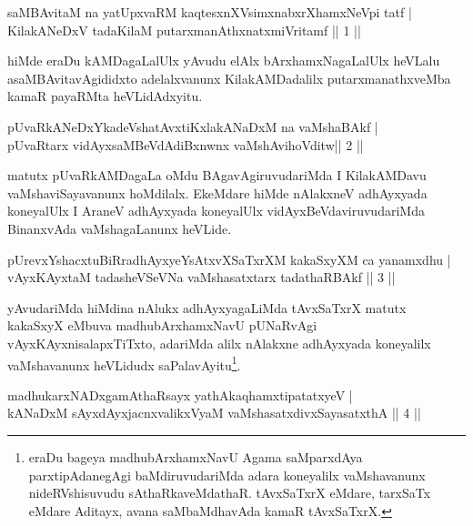 
\begin{shl}
saMBAvitaM na yatUpxvaRM kaqtesxnXV\s simxnabxrXhamxNeV\s pi tatf | \\
KilakANeDxV tadaKilaM putarxmanAthxnatxmiVritamf \hfill ||  1 ||  
\end{shl}

\begin{artha}
hiMde eraDu kAMDagaLalUlx yAvudu elAlx bArxhamxNagaLalUlx heVLalu asaMBAvitavAgididxto adelalxvanunx KilakAMDadalilx putarxmanathxveMba kamaR payaRMta heVLidAdxyitu.
\end{artha}

\begin{shl}
pUvaRkANeDxYkadeVshatAvxtiKxlakANaDxM na vaMshaBAkf | \\
pUvaRtarx vidAyxsaMBeVdAdiBxnwnx vaMshAvihoVditw\hfill||  2 ||  
\end{shl}

\begin{artha}
matutx pUvaRkAMDagaLa oMdu BAgavAgiruvudariMda I KilakAMDavu vaMshaviSayavanunx hoMdilalx. EkeMdare hiMde nAlakxneV adhAyxyada koneyalUlx I AraneV adhAyxyada koneyalUlx vidAyxBeVdaviruvudariMda BinanxvAda vaMshagaLanunx heVLide.
\end{artha}


\begin{shl}
pUrevxYshacxtuBiRradhAyxyeYsAtxvXSaTxrXM kakaSxyXM  ca yanamxdhu | \\
vAyxKAyxtaM tadasheVSeVNa vaMshasatxtarx tadathaRBAkf \hfill||  3 ||  
\end{shl}

\begin{artha}
yAvudariMda hiMdina nAlukx adhAyxyagaLiMda tAvxSaTxrX matutx kakaSxyX eMbuva madhubArxhamxNavU pUNaRvAgi vAyxKAyxnisalapxTiTxto, adariMda alilx nAlakxne adhAyxyada koneyalilx vaMshavanunx heVLidudx saPalavAyitu\footnote[1]{eraDu bageya madhubArxhamxNavU Agama saMparxdAya parxtipAdanegAgi baMdiruvudariMda adara koneyalilx vaMshavanunx nideRVshisuvudu sAthaRkaveMdathaR. tAvxSaTxrX eMdare, tarxSaTx eMdare Aditayx, avana saMbaMdhavAda kamaR tAvxSaTxrX.}.
\end{artha}

\begin{shl}
madhukarxNADxgamAthaRsayx yathAkaqhamxtipatatxyeV | \\
kANaDxM sAyxdAyxjacnxvalikxVyaM vaMshasatxdivxSayasatxthA \hfill||  4 ||  
\end{shl}

